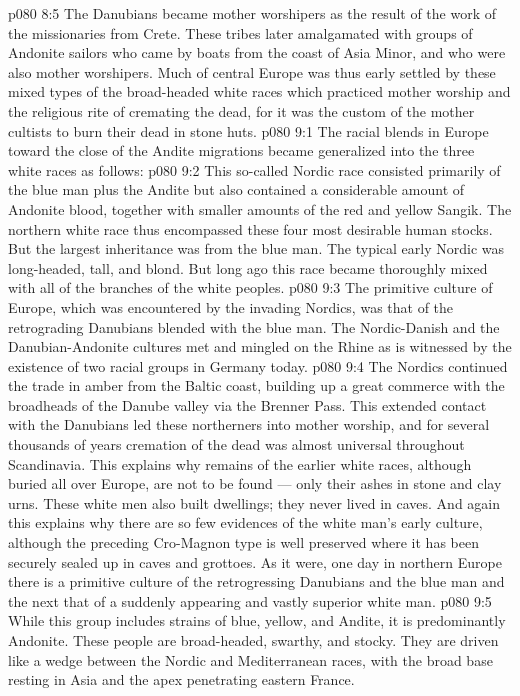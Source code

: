 \vs p080 8:5 The Danubians became mother worshipers as the result of the work of the missionaries from Crete. These tribes later amalgamated with groups of Andonite sailors who came by boats from the coast of Asia Minor, and who were also mother worshipers. Much of central Europe was thus early settled by these mixed types of the broad\hyp{}headed white races which practiced mother worship and the religious rite of cremating the dead, for it was the custom of the mother cultists to burn their dead in stone huts.
\vs p080 9:1 The racial blends in Europe toward the close of the Andite migrations became generalized into the three white races as follows:
\vs p080 9:2 \bibnobreakspace {} This so\hyp{}called Nordic race consisted primarily of the blue man plus the Andite but also contained a considerable amount of Andonite blood, together with smaller amounts of the red and yellow Sangik. The northern white race thus encompassed these four most desirable human stocks. But the largest inheritance was from the blue man. The typical early Nordic was long\hyp{}headed, tall, and blond. But long ago this race became thoroughly mixed with all of the branches of the white peoples.
\vs p080 9:3 The primitive culture of Europe, which was encountered by the invading Nordics, was that of the retrograding Danubians blended with the blue man. The Nordic\hyp{}Danish and the Danubian\hyp{}Andonite cultures met and mingled on the Rhine as is witnessed by the existence of two racial groups in Germany today.
\vs p080 9:4 The Nordics continued the trade in amber from the Baltic coast, building up a great commerce with the broadheads of the Danube valley via the Brenner Pass. This extended contact with the Danubians led these northerners into mother worship, and for several thousands of years cremation of the dead was almost universal throughout Scandinavia. This explains why remains of the earlier white races, although buried all over Europe, are not to be found --- only their ashes in stone and clay urns. These white men also built dwellings; they never lived in caves. And again this explains why there are so few evidences of the white man’s early culture, although the preceding Cro\hyp{}Magnon type is well preserved where it has been securely sealed up in caves and grottoes. As it were, one day in northern Europe there is a primitive culture of the retrogressing Danubians and the blue man and the next that of a suddenly appearing and vastly superior white man.
\vs p080 9:5 \pc {}\bibnobreakspace {} While this group includes strains of blue, yellow, and Andite, it is predominantly Andonite. These people are broad\hyp{}headed, swarthy, and stocky. They are driven like a wedge between the Nordic and Mediterranean races, with the broad base resting in Asia and the apex penetrating eastern France.

